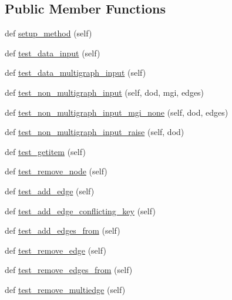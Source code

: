 \subsection*{Public Member Functions}
\begin{DoxyCompactItemize}
\item 
def \hyperlink{classnetworkx_1_1classes_1_1tests_1_1test__multigraph_1_1TestMultiGraph_a3bfbff90f8ab5082d239478308b451ba}{setup\+\_\+method} (self)
\item 
def \hyperlink{classnetworkx_1_1classes_1_1tests_1_1test__multigraph_1_1TestMultiGraph_aa377dd7cdd52a351d33183c3f6cf1f2c}{test\+\_\+data\+\_\+input} (self)
\item 
def \hyperlink{classnetworkx_1_1classes_1_1tests_1_1test__multigraph_1_1TestMultiGraph_a0608b59c21cf4e293b8a29e67ffbee2e}{test\+\_\+data\+\_\+multigraph\+\_\+input} (self)
\item 
def \hyperlink{classnetworkx_1_1classes_1_1tests_1_1test__multigraph_1_1TestMultiGraph_ac6bbcc21cac90b2bd1f13ad10f87f74f}{test\+\_\+non\+\_\+multigraph\+\_\+input} (self, dod, mgi, edges)
\item 
def \hyperlink{classnetworkx_1_1classes_1_1tests_1_1test__multigraph_1_1TestMultiGraph_a5dff8aa291b52c92176ce78e7c4b61a3}{test\+\_\+non\+\_\+multigraph\+\_\+input\+\_\+mgi\+\_\+none} (self, dod, edges)
\item 
def \hyperlink{classnetworkx_1_1classes_1_1tests_1_1test__multigraph_1_1TestMultiGraph_a7765076418711b28257e00a918c79eaa}{test\+\_\+non\+\_\+multigraph\+\_\+input\+\_\+raise} (self, dod)
\item 
def \hyperlink{classnetworkx_1_1classes_1_1tests_1_1test__multigraph_1_1TestMultiGraph_afa898b5b3c312daa1965573be163b6fc}{test\+\_\+getitem} (self)
\item 
def \hyperlink{classnetworkx_1_1classes_1_1tests_1_1test__multigraph_1_1TestMultiGraph_a470fcaa6e4eda4e9fa5f38031792d78e}{test\+\_\+remove\+\_\+node} (self)
\item 
def \hyperlink{classnetworkx_1_1classes_1_1tests_1_1test__multigraph_1_1TestMultiGraph_aa78339600ed2e4dfb499f847afe4bbc8}{test\+\_\+add\+\_\+edge} (self)
\item 
def \hyperlink{classnetworkx_1_1classes_1_1tests_1_1test__multigraph_1_1TestMultiGraph_a411b852d03b2e7557c9edc4ac03dc1eb}{test\+\_\+add\+\_\+edge\+\_\+conflicting\+\_\+key} (self)
\item 
def \hyperlink{classnetworkx_1_1classes_1_1tests_1_1test__multigraph_1_1TestMultiGraph_abd233d2ba546535162406c0e93d1fe4d}{test\+\_\+add\+\_\+edges\+\_\+from} (self)
\item 
def \hyperlink{classnetworkx_1_1classes_1_1tests_1_1test__multigraph_1_1TestMultiGraph_abedfefd6163dfcfc98129487aac806cd}{test\+\_\+remove\+\_\+edge} (self)
\item 
def \hyperlink{classnetworkx_1_1classes_1_1tests_1_1test__multigraph_1_1TestMultiGraph_a7d45195310c30200ef90cb84e9ca3953}{test\+\_\+remove\+\_\+edges\+\_\+from} (self)
\item 
def \hyperlink{classnetworkx_1_1classes_1_1tests_1_1test__multigraph_1_1TestMultiGraph_ab41c957ef666c03f3a23797ff28db5a0}{test\+\_\+remove\+\_\+multiedge} (self)
\end{DoxyCompactItemize}
